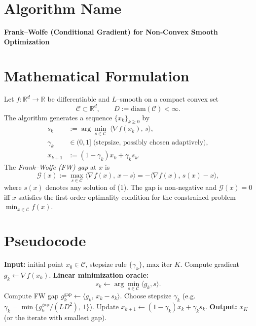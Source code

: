 \documentclass{article}
\newcommand{\gap}{\mathcal{G}}
\newcommand{\diam}{\mathrm{diam}}
\begin{document}
\section*{Algorithm Name}
\textbf{Frank–Wolfe (Conditional Gradient) for Non‑Convex Smooth Optimization}

\section*{Mathematical Formulation}
Let $f:\mathbb{R}^{d}\rightarrow\mathbb{R}$ be differentiable and $L$–smooth on a compact convex set
\[
\mathcal{C}\subset\mathbb{R}^{d},\qquad D:=\diam(\mathcal{C})<\infty .
\]
The algorithm generates a sequence $\{x_k\}_{k\ge 0}$ by
\begin{align}
s_k &:= \arg\min_{s\in\mathcal{C}}\;\langle \nabla f(x_k),\,s\rangle , \tag{1}\\
\gamma_k &\in (0,1] \;\text{(stepsize, possibly chosen adaptively)}, \\
x_{k+1} &:= (1-\gamma_k)x_k+\gamma_k s_k . \tag{2}
\end{align}
The \emph{Frank–Wolfe (FW) gap} at $x$ is
\[
\gap(x):=\max_{s\in\mathcal{C}}\langle \nabla f(x),\,x-s\rangle
          =-\langle \nabla f(x),\,s(x)-x\rangle ,
\]
where $s(x)$ denotes any solution of (1).  The gap is non‑negative and
$\gap(x)=0$ iff $x$ satisfies the first‑order optimality condition for the
constrained problem $\min_{x\in\mathcal{C}}f(x)$.

\section*{Pseudocode}
\begin{algorithm}[H]
\caption{Frank–Wolfe for Non‑Convex Smooth $f$}
\begin{algorithmic}[1]
\STATE \textbf{Input:} initial point $x_0\in\mathcal{C}$, stepsize rule $\{\gamma_k\}$, max iter $K$.
    \STATE Compute gradient $g_k \gets \nabla f(x_k)$.
    \STATE \textbf{Linear minimization oracle:}
          \[
          s_k \gets \arg\min_{s\in\mathcal{C}}\langle g_k,s\rangle .
          \]
    \STATE Compute FW gap $g_k^{\text{gap}}\gets \langle g_k,\,x_k-s_k\rangle$.
    \STATE Choose stepsize $\gamma_k$ (e.g. $\gamma_k = \min\{g_k^{\text{gap}}/(L D^2),\,1\}$).
    \STATE Update $x_{k+1}\gets (1-\gamma_k)x_k+\gamma_k s_k$.
\ENDFOR
\STATE \textbf{Output:} $x_K$ (or the iterate with smallest gap).
\end{algorithmic}
\end{algorithm}
\end{document}
